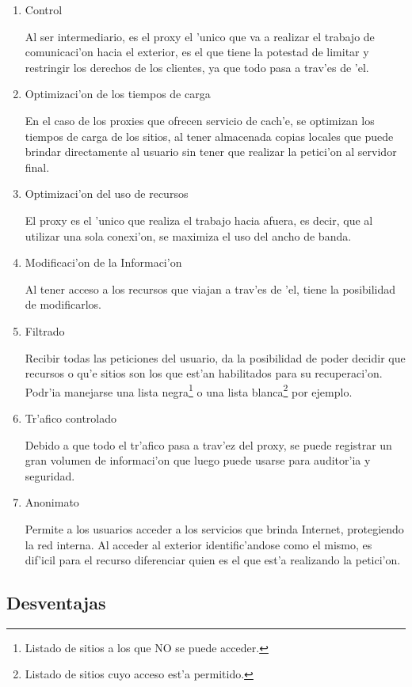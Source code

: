 \begin{enumerate}
\item Control

Al ser intermediario, es el proxy el 'unico que va a realizar el trabajo de comunicaci'on hacia el exterior, es el que tiene la potestad de limitar y restringir los derechos de los clientes, ya que todo pasa a trav'es de 'el.
\item Optimizaci'on de los tiempos de carga

En el caso de los proxies que ofrecen servicio de cach'e, se optimizan los tiempos de carga de los sitios, al tener almacenada copias locales que puede brindar directamente al usuario sin tener que realizar la petici'on al servidor final.
\item Optimizaci'on del uso de recursos

El proxy es el 'unico que realiza el trabajo hacia afuera, es decir, que al utilizar una sola conexi'on, se maximiza el uso del ancho de banda.
\item Modificaci'on de la Informaci'on

Al tener acceso a los recursos que viajan a trav'es de 'el, tiene la posibilidad de modificarlos.
\item Filtrado

Recibir todas las peticiones del usuario, da la posibilidad de poder decidir que recursos o qu'e sitios son los que est'an habilitados para su recuperaci'on. Podr'ia manejarse una lista negra\footnote{Listado de sitios a los que NO se puede acceder.} o una lista blanca\footnote{Listado de sitios cuyo acceso est'a permitido.} por ejemplo.

\item Tr'afico controlado

Debido a que todo el tr'afico pasa a trav'ez del proxy, se puede registrar un gran volumen de informaci'on que luego puede usarse para auditor'ia y seguridad.
\item Anonimato

Permite a los usuarios acceder a los servicios que brinda Internet, protegiendo la red interna. Al acceder al exterior identific'andose como el mismo, es dif'icil para el recurso diferenciar quien es el que est'a realizando la petici'on.
\end{enumerate}

\subsection{Desventajas}

